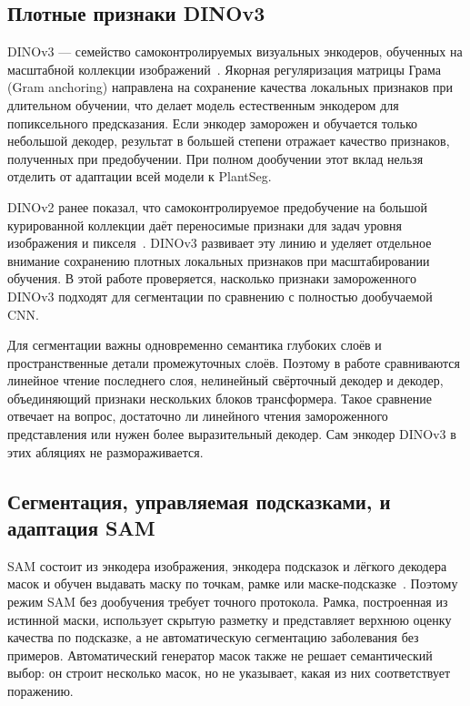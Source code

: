 \documentclass[a4paper,12pt]{extarticle}
\begin{document}
\subsection{Плотные признаки DINOv3}

DINOv3 --- семейство самоконтролируемых визуальных энкодеров, обученных на
масштабной коллекции изображений~\cite{dinov3}. Якорная регуляризация матрицы
Грама (Gram anchoring) направлена
на сохранение качества локальных признаков при длительном обучении, что делает
модель естественным энкодером для попиксельного предсказания. Если энкодер
заморожен и обучается только небольшой декодер, результат в большей степени
отражает качество признаков, полученных при предобучении. При полном дообучении
этот вклад нельзя отделить от адаптации всей модели к PlantSeg.

DINOv2 ранее показал, что самоконтролируемое предобучение на большой
курированной коллекции даёт переносимые признаки для задач уровня изображения
и пикселя~\cite{dinov2}. DINOv3 развивает эту линию и уделяет отдельное внимание
сохранению плотных локальных признаков при масштабировании обучения. В этой
работе проверяется, насколько признаки замороженного DINOv3 подходят для
сегментации по сравнению с полностью дообучаемой CNN.

Для сегментации важны одновременно семантика глубоких слоёв и пространственные
детали промежуточных слоёв. Поэтому в работе сравниваются линейное чтение
последнего слоя, нелинейный свёрточный декодер и декодер, объединяющий признаки
нескольких блоков трансформера. Такое сравнение отвечает на вопрос, достаточно
ли линейного чтения замороженного представления или нужен более выразительный
декодер. Сам энкодер DINOv3 в этих абляциях не размораживается.

\subsection{Сегментация, управляемая подсказками, и адаптация SAM}

SAM состоит из энкодера изображения, энкодера подсказок и лёгкого декодера масок и обучен
выдавать маску по точкам, рамке или маске-подсказке~\cite{sam}. Поэтому режим
SAM без дообучения требует точного протокола. Рамка, построенная из истинной маски,
использует скрытую разметку и представляет верхнюю оценку качества по подсказке, а не
автоматическую сегментацию заболевания без примеров. Автоматический генератор масок
также не решает семантический выбор: он строит несколько масок, но не указывает,
какая из них соответствует поражению.
\end{document}
